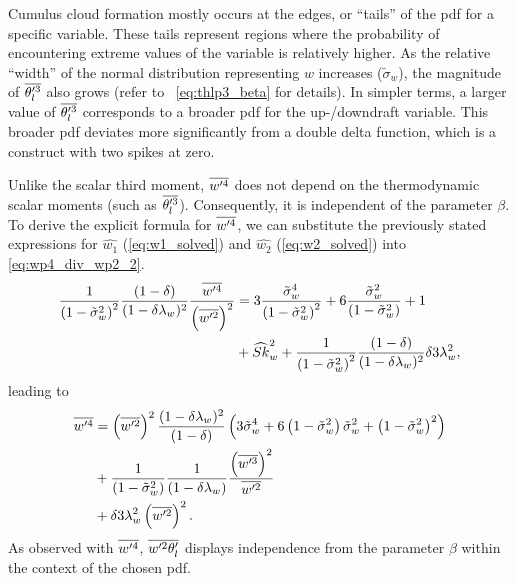 Cumulus cloud formation mostly occurs at the edges,
or \enquote{tails} of the \gls{pdf} for a specific variable.
These tails represent regions where the probability of encountering extreme values of the variable is relatively higher.
As the relative \enquote{width} of the normal distribution representing $w$ increases ($\tilde{\sigma}_w$),
the magnitude of $\overline{\theta_l'^3}$ also grows (refer to ~\cref{eq:thlp3_beta} for details).
In simpler terms, a larger value of $\overline{\theta_l'^3}$ corresponds to a broader \gls{pdf} for the up-/downdraft variable.
This broader \gls{pdf} deviates more significantly from a double delta function,
which is a construct with two spikes at zero.

Unlike the scalar third moment,
$\overline{w'^4}$ does not depend on the thermodynamic scalar moments (such as $\overline{\theta_l'^3}$).
Consequently, it is independent of the parameter $\beta$.
To derive the explicit formula for $\overline{w'^4}$,
we can substitute the previously stated expressions for $\widehat{w_1}$ (\cref{eq:w1_solved})
and $\widehat{w_2}$ (\cref{eq:w2_solved}) into \cref{eq:wp4_div_wp2_2}.
\begin{align}
    \label{eq:wp4_div_wp2_2_solved}
    \frac{1}{\left( 1 - \tilde{\sigma}_w^2 \right)^2} \frac{(1-\delta)}{(1-\delta \lambda_w)^2} \frac{\overline{w'^4}}{\left(\overline{w'^2}\right)^2}
    &= 3 \frac{{\tilde{\sigma}_w}^4}{\left( 1 - \tilde{\sigma}_w^2 \right)^2} + 6 \frac{{\tilde{\sigma}_w}^2}{\left( 1 - \tilde{\sigma}_w^2 \right)} + 1 \nonumber\\
    &+ \widehat{Sk}_w^2 + \frac{1}{\left( 1 - \tilde{\sigma}_w^2 \right)^2} \frac{(1-\delta)}{(1-\delta \lambda_w)^2} \delta 3 \lambda_w^2,
\end{align}
leading to
\begin{align}
    \label{eq:wp4}
    \overline{w'^4}
    &= \left(\overline{w'^2}\right)^2
    \frac{(1-\delta \lambda_w)^2}{(1-\delta)}
    \left(3 \tilde{\sigma}_w^4 + 6 \left( 1 - \tilde{\sigma}_w^2 \right) \tilde{\sigma}_w^2 + \left( 1 - \tilde{\sigma}_w^2 \right)^2\right) \nonumber\\
    &+ \frac{1}{\left( 1 - \tilde{\sigma}_w^2 \right)} \frac{1}{(1-\delta \lambda_w)}
    \frac{\left(\overline{w'^3}\right)^2}{\overline{w'^2}} \nonumber\\
    &+ \delta 3 \lambda_w^2 \left(\overline{w'^2}\right)^2.
\end{align}
As observed with $\overline{w'^4}$,
$\overline{w'^2 \theta_l'}$ displays independence from the parameter $\beta$
within the context of the chosen \gls{pdf}.

